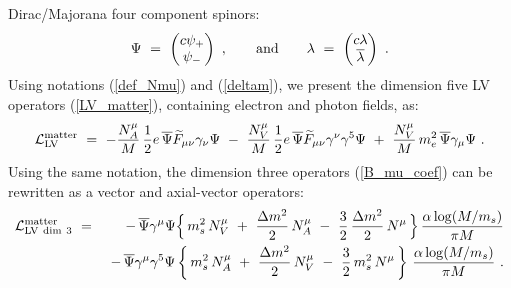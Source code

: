 \documentclass[12pt]{revtex4}
\begin{document}
Dirac/Majorana four component spinors: 
\begin{equation}
\label{Dirac_spinors}
   \Psi ~=~
                 \begin{pmatrix}{c}
                    \psi_+ \\
                    \psi_-
                 \end{pmatrix}
          ~, \qquad  {\rm and} \qquad 
   \lambda ~=~ 
                 \begin{pmatrix}{c}
                    \lambda \\
                    \overline{\lambda}
                 \end{pmatrix}
~.
\end{equation}
%
Using notations (\ref{def_Nmu}) and (\ref{deltam}), we present the
dimension five LV operators (\ref{LV_matter}), containing electron and
photon fields, as:
\begin{equation}
   \mathcal{L}_{\rm LV}^{\rm matter} ~=~ 
        -
       \frac{N_A^\mu}
              {M} \, \frac{1}{2}e \,
       \overline{\Psi} \widetilde{F}_{\mu\nu}
                       \gamma_\nu \Psi 
     ~-~
        \frac{N_V^\mu}
              {M} \, \frac{1}{2}e \,
       \overline{\Psi} \widetilde{F}_{\mu\nu}
                       \gamma^\nu \gamma^5 \Psi 
~+~  \frac{N_V^\mu}{M} \,m_e^2\, \overline{\Psi} \gamma_\mu \Psi
     ~.
\label{resolved_LV_Dirac}
\end{equation}
%
Using the same notation, the dimension three operators 
(\ref{B_mu_coef}) can be rewritten as a vector and 
axial-vector operators:
%
\begin{eqnarray}
\nonumber
        \mathcal{L}_{\rm{LV\ dim\ 3}}^{\rm matter} &~=~ &
-\, \overline{\Psi} \gamma^\mu \Psi 
\Big\{\,
         m_s^2\, N_V^\mu 
~+~
 \frac{\Delta m^2}{2}\, N_A^\mu 
~-~
\frac{3}{2}\, \frac{\Delta m^2}{2}\, N^\mu
       \,
\Big\}\, \frac{\alpha\log (M/m_s) }{\pi M}
\\
\label{LV_induced_dim3}
&&
-\, \overline{\Psi} \gamma^\mu \gamma^5 \Psi 
\left\{\,
        m_s^2\, N_A^\mu 
~+~
\frac{\Delta m^2}{2}\, N_V^\mu 
~-~
\frac{3}{2}\, m_s^2\, N^\mu
       \,
\right\}\, \frac{\alpha\log (M/m_s)}{\pi M}~.
\end{eqnarray}
\end{document}
